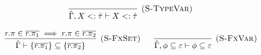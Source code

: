 \documentclass{llncs}
\begin{document}
\[\begin{array}{c}
\infer[\textsc{(S-TypeVar)}]
	{\hat \Gamma, X <: \hat \tau \vdash X <: \hat \tau}
	{}                                                                                                                                                                                                                                                                                                                                                                                                                                                                                                                                                                                                                                                                                                                                                                                                                                                                                                                                                                                                                                                                                                                                                                                                                                                                                                                                                                                                                                                                                                                                                                                                                                                                                                                    

\end{array}
\]






\fbox{$\hat \Gamma \vdash \varepsilon \subseteq \varepsilon$}

\[
\begin{array}{c}


\infer[\textsc{(S-FxSet)}]
	{\hat \Gamma \vdash \{ \overline{r.\pi_1} \} \subseteq \{ \overline{r.\pi_2} \} }
	{r.\pi \in \overline{r.\pi_1} \implies r.\pi \in \overline{r.\pi_2}}

~~~~~

\infer[\textsc{(S-FxVar)}]
	{\hat \Gamma, \phi \subseteq \varepsilon \vdash \phi \subseteq \varepsilon}
	{}

\end{array}
\]
\end{document}
